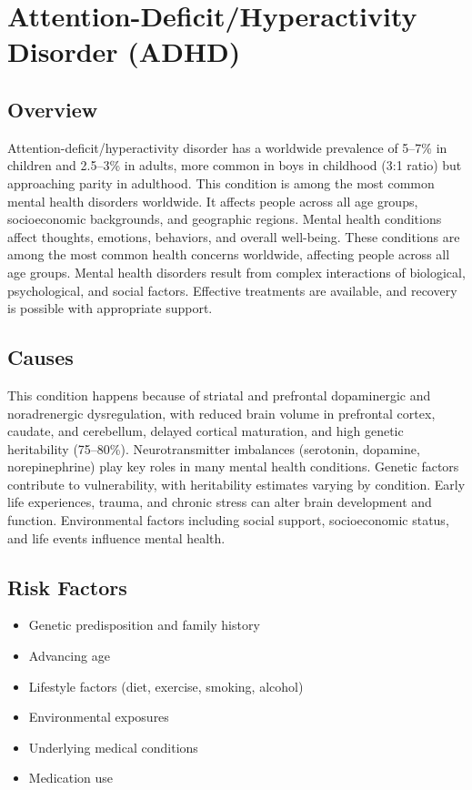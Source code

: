 \chapter{Attention-Deficit/Hyperactivity Disorder (ADHD)}
\label{sec:Attention-Deficit/Hyperactivity Disorder (ADHD)}

\section{Overview}
Attention-deficit/hyperactivity disorder has a worldwide prevalence of 5--7\% in children and 2.5--3\% in adults, more common in boys in childhood (3:1 ratio) but approaching parity in adulthood. This condition is among the most common mental health disorders worldwide. It affects people across all age groups, socioeconomic backgrounds, and geographic regions. Mental health conditions affect thoughts, emotions, behaviors, and overall well-being. These conditions are among the most common health concerns worldwide, affecting people across all age groups. Mental health disorders result from complex interactions of biological, psychological, and social factors. Effective treatments are available, and recovery is possible with appropriate support.
\section{Causes}
This condition happens because of striatal and prefrontal dopaminergic and noradrenergic dysregulation, with reduced brain volume in prefrontal cortex, caudate, and cerebellum, delayed cortical maturation, and high genetic heritability (75--80\%).  Neurotransmitter imbalances (serotonin, dopamine, norepinephrine) play key roles in many mental health conditions. Genetic factors contribute to vulnerability, with heritability estimates varying by condition. Early life experiences, trauma, and chronic stress can alter brain development and function. Environmental factors including social support, socioeconomic status, and life events influence mental health.   
\section{Risk Factors}
\begin{itemize}[noitemsep]
  \item Genetic predisposition and family history
  \item Advancing age
  \item Lifestyle factors (diet, exercise, smoking, alcohol)
  \item Environmental exposures
  \item Underlying medical conditions
  \item Medication use
\end{itemize}
